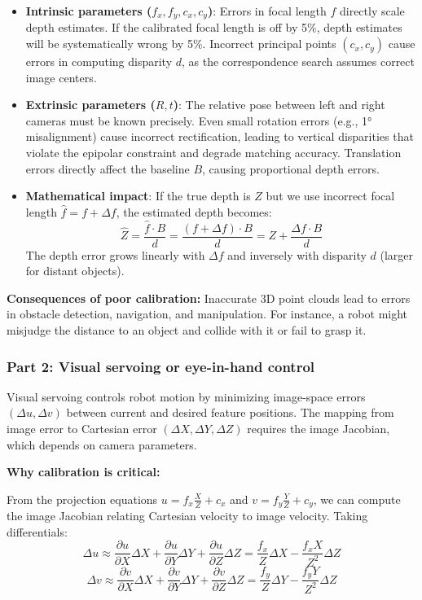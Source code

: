 \documentclass[11pt]{article}
\begin{document}
\begin{itemize}
    \item \textbf{Intrinsic parameters ($f_x, f_y, c_x, c_y$)}: Errors in focal length $f$ directly scale depth estimates. If the calibrated focal length is off by 5\%, depth estimates will be systematically wrong by 5\%. Incorrect principal points $(c_x, c_y)$ cause errors in computing disparity $d$, as the correspondence search assumes correct image centers.
    
    \item \textbf{Extrinsic parameters ($R, t$)}: The relative pose between left and right cameras must be known precisely. Even small rotation errors (e.g., 1° misalignment) cause incorrect rectification, leading to vertical disparities that violate the epipolar constraint and degrade matching accuracy. Translation errors directly affect the baseline $B$, causing proportional depth errors.
    
    \item \textbf{Mathematical impact}: If the true depth is $Z$ but we use incorrect focal length $\hat{f} = f + \Delta f$, the estimated depth becomes:
    \[
    \hat{Z} = \frac{\hat{f} \cdot B}{d} = \frac{(f + \Delta f) \cdot B}{d} = Z + \frac{\Delta f \cdot B}{d}
    \]
    The depth error grows linearly with $\Delta f$ and inversely with disparity $d$ (larger for distant objects).
\end{itemize}

\textbf{Consequences of poor calibration:} Inaccurate 3D point clouds lead to errors in obstacle detection, navigation, and manipulation. For instance, a robot might misjudge the distance to an object and collide with it or fail to grasp it.

\subsubsection*{Part 2: Visual servoing or eye-in-hand control}

Visual servoing controls robot motion by minimizing image-space errors $(\Delta u, \Delta v)$ between current and desired feature positions. The mapping from image error to Cartesian error $(\Delta X, \Delta Y, \Delta Z)$ requires the image Jacobian, which depends on camera parameters.

\textbf{Why calibration is critical:}

From the projection equations $u = f_x \frac{X}{Z} + c_x$ and $v = f_y \frac{Y}{Z} + c_y$, we can compute the image Jacobian relating Cartesian velocity to image velocity. Taking differentials:
\[
\Delta u \approx \frac{\partial u}{\partial X} \Delta X + \frac{\partial u}{\partial Y} \Delta Y + \frac{\partial u}{\partial Z} \Delta Z = \frac{f_x}{Z} \Delta X - \frac{f_x X}{Z^2} \Delta Z
\]
\[
\Delta v \approx \frac{\partial v}{\partial X} \Delta X + \frac{\partial v}{\partial Y} \Delta Y + \frac{\partial v}{\partial Z} \Delta Z = \frac{f_y}{Z} \Delta Y - \frac{f_y Y}{Z^2} \Delta Z
\]
\end{document}
